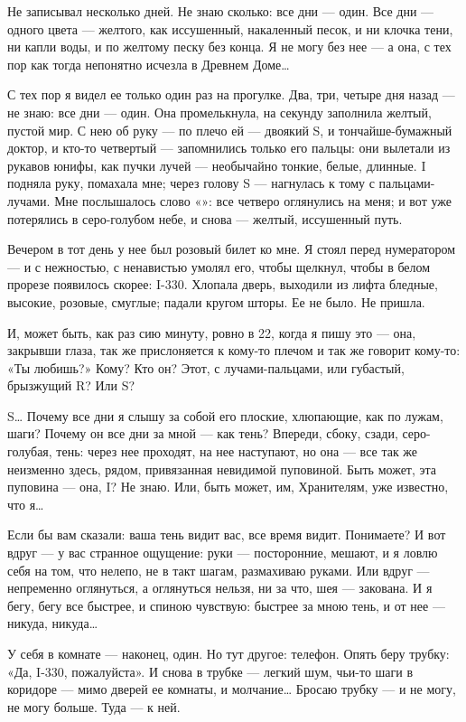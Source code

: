 \documentclass[11pt,openany]{book}
\begin{document}
Не записывал несколько дней. Не знаю сколько: все дни --- один. Все дни --- одного цвета --- желтого, как иссушенный, накаленный песок, и ни клочка тени, ни капли воды, и по желтому песку без конца. Я не могу без нее --- а она, с тех пор как тогда непонятно исчезла в Древнем Доме\ldots{}

С тех пор я видел ее только один раз на прогулке. Два, три, четыре дня назад --- не знаю: все дни --- один. Она промелькнула, на секунду заполнила желтый, пустой мир. С нею об руку --- по плечо ей --- двоякий S, и тончайше-бумажный доктор, и кто-то четвертый --- запомнились только его пальцы: они вылетали из рукавов юнифы, как пучки лучей --- необычайно тонкие, белые, длинные. I подняла руку, помахала мне; через голову S --- нагнулась к тому с пальцами-лучами. Мне послышалось слово «»: все четверо оглянулись на меня; и вот уже потерялись в серо-голубом небе, и снова --- желтый, иссушенный путь.

Вечером в тот день у нее был розовый билет ко мне. Я стоял перед нумератором --- и с нежностью, с ненавистью умолял его, чтобы щелкнул, чтобы в белом прорезе появилось скорее: I-330. Хлопала дверь, выходили из лифта бледные, высокие, розовые, смуглые; падали кругом шторы. Ее не было. Не пришла.

И, может быть, как раз сию минуту, ровно в 22, когда я пишу это --- она, закрывши глаза, так же прислоняется к кому-то плечом и так же говорит кому-то: «Ты любишь?» Кому? Кто он? Этот, с лучами-пальцами, или губастый, брызжущий R? Или S?

S\ldots{} Почему все дни я слышу за собой его плоские, хлюпающие, как по лужам, шаги? Почему он все дни за мной --- как тень? Впереди, сбоку, сзади, серо-голубая,  тень: через нее проходят, на нее наступают, но она --- все так же неизменно здесь, рядом, привязанная невидимой пуповиной. Быть может, эта пуповина --- она, I? Не знаю. Или, быть может, им, Хранителям, уже известно, что я\ldots{}

Если бы вам сказали: ваша тень видит вас, все время видит. Понимаете? И вот вдруг --- у вас странное ощущение: руки --- посторонние, мешают, и я ловлю себя на том, что нелепо, не в такт шагам, размахиваю руками. Или вдруг --- непременно оглянуться, а оглянуться нельзя, ни за что, шея --- закована. И я бегу, бегу все быстрее, и спиною чувствую: быстрее за мною тень, и от нее --- никуда, никуда\ldots{}

У себя в комнате --- наконец, один. Но тут другое: телефон. Опять беру трубку: «Да, I-330, пожалуйста». И снова в трубке --- легкий шум, чьи-то шаги в коридоре --- мимо дверей ее комнаты, и молчание\ldots{} Бросаю трубку --- и не могу, не могу больше. Туда --- к ней.
\end{document}
